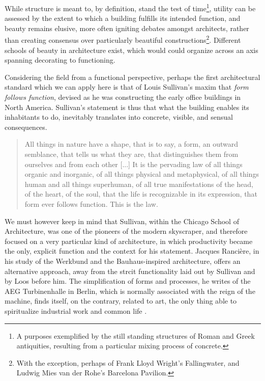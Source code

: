 While structure is meant to, by definition, stand the test of time\footnote{A purposes exemplified by the still standing structures of Roman and Greek antiquities, resulting from a particular mixing process of concrete.}, utility can be assessed by the extent to which a building fulfills its intended function, and beauty remains elusive, more often igniting debates amongst architects, rather than creating consensus over particularly beautiful constructions\footnote{With the exception, perhaps of Frank Lloyd Wright's Fallingwater, and Ludwig Mies van der Rohe's Barcelona Pavilion.}. Different schools of beauty in architecture exist, which would could organize across an axis spanning decorating to functioning.

Considering the field from a functional perspective, perhaps the first architectural standard which we can apply here is that of Louis Sullivan's maxim that \emph{form follows function}, devised as he was constructing the early office buildings in North America. Sullivan's statement is thus that what the building enables its inhabitants to do, inevitably translates into concrete, visible, and sensual consequences.

\begin{quote}
  All things in nature have a shape, that is to say, a form, an outward semblance, that tells us what they are, that distinguishes them from ourselves and from each other
  [...]
  It is the pervading law of all things organic and inorganic, of all things physical and metaphysical, of all things human and all things superhuman, of all true manifestations of the head, of the heart, of the soul, that the life is recognizable in its expression, that form ever follows function. This is the law. \citep{sullivan_tall_1896}
\end{quote}


We must however keep in mind that Sullivan, within the Chicago School of Architecture, was one of the pioneers of the modern skyscraper, and therefore focused on a very particular kind of architecture, in which productivity became the only, explicit function and the context for his statement. Jacques Rancière, in his study of the Werkbund and the Bauhaus-inspired architecture, offers an alternative approach, away from the strcit functionality laid out by Sullivan and by Loos before him. The simplification of forms and processes, he writes of the AEG Turbinenhalle in Berlin, which is normally associated with the reign of the machine, finds itself, on the contrary, related to art, the only thing able to spiritualize industrial work and common life \citep{ranciere_aisthesis_2013}.

